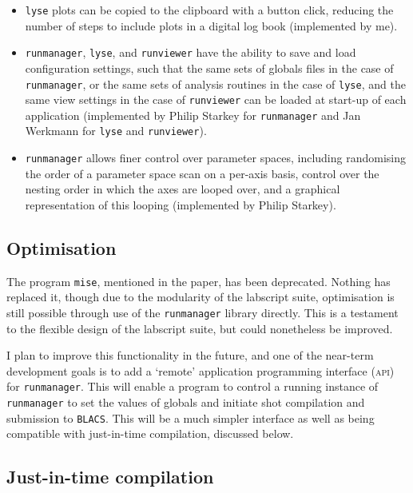 \begin{itemize}
    \item \texttt{lyse} plots can be copied to the clipboard with a button click, reducing the number of steps to include plots in a digital log book (implemented by me).
    
    \item \texttt{runmanager}, \texttt{lyse}, and \texttt{runviewer} have the ability to save and load configuration settings, such that the same sets of globals files in the case of \texttt{runmanager}, or the same sets of analysis routines in the case of \texttt{lyse}, and the same view settings in the case of \texttt{runviewer} can be loaded at start-up of each application (implemented by Philip Starkey for \texttt{runmanager} and Jan Werkmann for \texttt{lyse} and \texttt{runviewer}).
    
    \item \texttt{runmanager} allows finer control over parameter spaces, including randomising the order of a parameter space scan on a per-axis basis, control over the nesting order in which the axes are looped over, and a graphical representation of this looping (implemented by Philip Starkey).
\end{itemize}

\subsection{Optimisation}

The program \texttt{mise}, mentioned in the paper, has been deprecated. Nothing has replaced it, though due to the modularity of the labscript suite, optimisation is still possible through use of the \texttt{runmanager} library directly. This is a testament to the flexible design of the labscript suite, but could nonetheless be improved.

I plan to improve this functionality in the future, and one of the near-term development goals is to add a `remote' application programming interface (\textsc{api}) for \texttt{runmanager}. This will enable a program to control a running instance of \texttt{runmanager} to set the values of globals and initiate shot compilation and submission to \texttt{BLACS}. This will be a much simpler interface as well as being compatible with just-in-time compilation, discussed below.

\subsection{Just-in-time compilation}\label{sec:jit}

